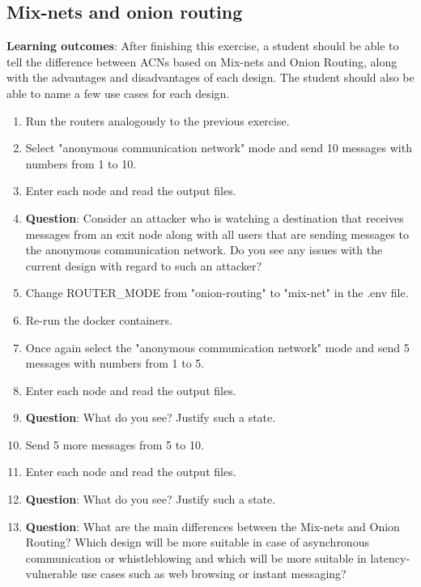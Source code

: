 \subsection{Mix-nets and onion routing}
\textbf{Learning outcomes}: After finishing this exercise, a student should be able to tell the difference between ACNs based on Mix-nets and Onion Routing, along with the advantages and disadvantages of each design. The student should also be able to name a few use cases for each design.
\begin{enumerate}
    \item Run the routers analogously to the previous exercise.
    \item Select "anonymous communication network" mode and send 10 messages with numbers from 1 to 10.
    \item Enter each node and read the output files.
    \item \textbf{Question}: Consider an attacker who is watching a destination that receives messages from an exit node along with all users that are sending messages to the anonymous communication network. Do you see any issues with the current design with regard to such an attacker?
    \item Change ROUTER\_MODE from "onion-routing" to "mix-net" in the .env file.
    \item Re-run the docker containers.
    \item Once again select the "anonymous communication network" mode and send 5 messages with numbers from 1 to 5.
    \item Enter each node and read the output files.
    \item \textbf{Question}: What do you see? Justify such a state.
    \item Send 5 more messages from 5 to 10.
    \item Enter each node and read the output files.
    \item \textbf{Question}: What do you see? Justify such a state.
    \item \textbf{Question}: What are the main differences between the Mix-nets and Onion Routing? Which design will be more suitable in case of asynchronous communication or whistleblowing and which will be more suitable in latency-vulnerable use cases such as web browsing or instant messaging?
\end{enumerate}

